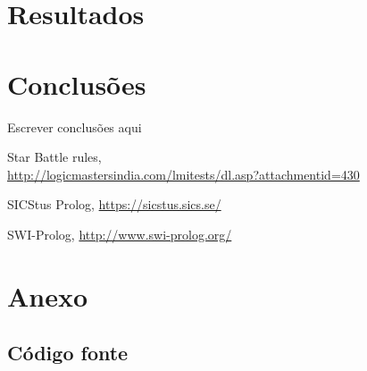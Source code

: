 \documentclass[runningheads,a4paper]{llncs}
\begin{document}
\section{Resultados}

\section{Conclusões}

Escrever conclusões aqui


\begin{thebibliography}{4}

 Star Battle rules,\\
\url{http://logicmastersindia.com/lmitests/dl.asp?attachmentid=430}

 SICStus Prolog, \url{https://sicstus.sics.se/}

 SWI-Prolog, \url{http://www.swi-prolog.org/}

\end{thebibliography}


\section*{Anexo}

\subsection*{Código fonte}

\newenvironment{changemargin}[2]{%
\begin{list}{}{%
\setlength{\topsep}{0pt}%
\setlength{\leftmargin}{#1}%
\setlength{\rightmargin}{#2}%
\setlength{\listparindent}{\parindent}%
\setlength{\itemindent}{\parindent}%
\setlength{\parsep}{\parskip}%
}%
\item[]}{
\end{list}}

\medskip
\end{document}
